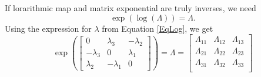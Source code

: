 \documentclass[10pt,letterpaper,oneside,notitlepage]{article}
\begin{document}
If lorarithmic map and matrix exponential are truly inverses, we need 
\begin{equation}
\exp(\log(\Lambda)) = \Lambda. 
\end{equation}
Using the expression for $\lambda$ from Equation \ref{EqLog}, we get
\begin{equation}
\label{EqExpMatrix}
	\exp\left(
 \begin{bmatrix}
		0          &  \lambda_3 & -\lambda_2 \\
		-\lambda_3 &  0         &  \lambda_1 \\	
		 \lambda_2 & -\lambda_1 &  0          
	\end{bmatrix}
\right)	= \Lambda =
 \begin{bmatrix}
  \Lambda_{11} & \Lambda_{12} & \Lambda_{13} \\
  \Lambda_{21} & \Lambda_{22} & \Lambda_{23} \\
  \Lambda_{31} & \Lambda_{32} & \Lambda_{33} \\
 \end{bmatrix}
\end{equation}
\end{document}
